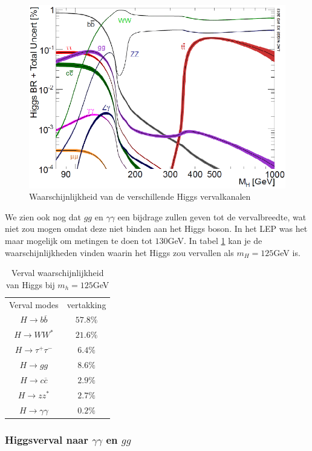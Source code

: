 \documentclass[../main.tex]{subfiles}
\begin{document}
\begin{figure}[h]
    \centering
    \includegraphics[width=0.6\linewidth]{higgs_boson/verval_higgs.png}
    \caption{Waarschijnlijkheid van de verschillende Higgs vervalkanalen}%
    \label{fig:higgs_boson/verval_higgs}
\end{figure}

We zien ook nog dat $gg$ en $\gamma\gamma$ een bijdrage zullen geven tot de vervalbreedte, wat niet zou mogen omdat deze niet binden aan het Higgs boson. In het LEP was het maar mogelijk om metingen te doen tot $130$GeV. In tabel \ref{tab:h_verval_125_gev} kan je de waarschijnlijkheden vinden waarin het Higgs zou vervallen als $m_H=125$GeV is.

\begin{table}[h]
    \centering
    \caption{Verval waarschijnlijkheid van Higgs bij $m_h=125$GeV}
    \label{tab:h_verval_125_gev}
    \begin{tabular}{cc}
        Verval modes & vertakking \\
        $H\rightarrow b\overline b$ & $57.8\%$ \\
        $H\rightarrow WW^*$ & $21.6\%$ \\
        $H\rightarrow \tau^+\tau^-$ & $6.4\%$ \\
        $H\rightarrow gg$ & $8.6\%$ \\
        $H\rightarrow c\overline c$ & $2.9\%$ \\
        $H\rightarrow zz^*$ & $2.7\%$ \\
        $H\rightarrow \gamma\gamma$ & $0.2\%$ \\
    \end{tabular}
\end{table}

\subsubsection{Higgsverval naar $\gamma\gamma$ en $gg$}%
\label{ssub:higgs_verval_naar_gammagamma_en_gg_}
\end{document}
